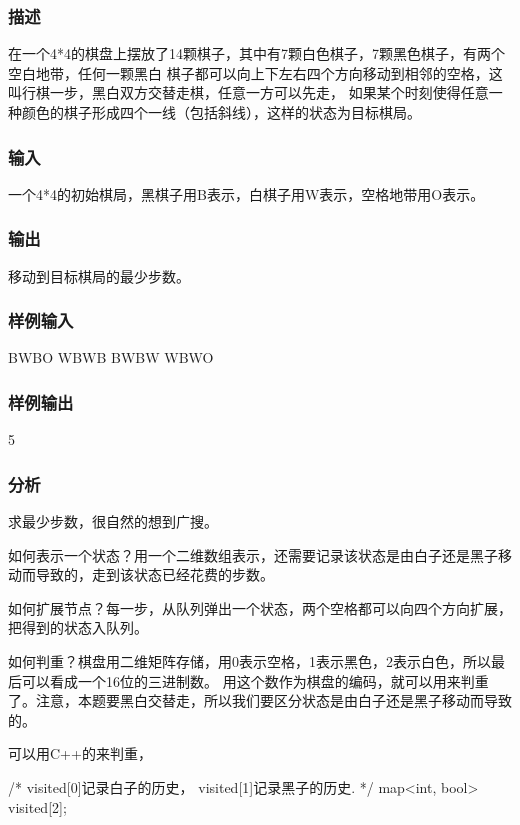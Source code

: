 \subsubsection{描述}
在一个4*4的棋盘上摆放了14颗棋子，其中有7颗白色棋子，7颗黑色棋子，有两个空白地带，任何一颗黑白
棋子都可以向上下左右四个方向移动到相邻的空格，这叫行棋一步，黑白双方交替走棋，任意一方可以先走，
如果某个时刻使得任意一种颜色的棋子形成四个一线（包括斜线），这样的状态为目标棋局。

\subsubsection{输入}
一个4*4的初始棋局，黑棋子用B表示，白棋子用W表示，空格地带用O表示。

\subsubsection{输出}
移动到目标棋局的最少步数。

\subsubsection{样例输入}
\begin{Code}
BWBO
WBWB
BWBW
WBWO
\end{Code}

\subsubsection{样例输出}
\begin{Code}
5
\end{Code}

\subsubsection{分析}
求最少步数，很自然的想到广搜。

如何表示一个状态？用一个二维数组表示，还需要记录该状态是由白子还是黑子移动而导致的，走到该状态已经花费的步数。

如何扩展节点？每一步，从队列弹出一个状态，两个空格都可以向四个方向扩展，把得到的状态入队列。

如何判重？棋盘用二维矩阵存储，用0表示空格，1表示黑色，2表示白色，所以最后可以看成一个16位的三进制数。
用这个数作为棋盘的编码，就可以用来判重了。注意，本题要黑白交替走，所以我们要区分状态是由白子还是黑子移动而导致的。

可以用C++的来判重，
\begin{Code}
/* visited[0]记录白子的历史， visited[1]记录黑子的历史. */
map<int, bool> visited[2];
\end{Code}

